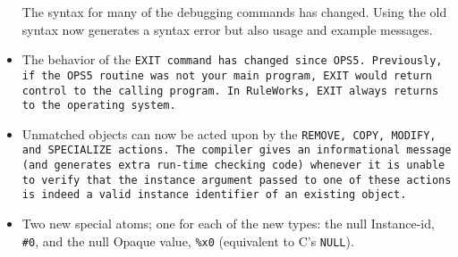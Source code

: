 \begin{itemize}
  The syntax for many of the debugging commands has changed. Using the
  old syntax now generates a syntax error but also usage and example
  messages.

\item The behavior of the \tt{EXIT} command has changed since
  OPS5. Previously, if the OPS5 routine was not your main program,
  \tt{EXIT} would return control to the calling program. In RuleWorks,
  \tt{EXIT} always returns to the operating system.

\item Unmatched objects can now be acted upon by the \tt{REMOVE},
  \tt{COPY}, \tt{MODIFY}, and \tt{SPECIALIZE} actions. The compiler
  gives an informational message (and generates extra run-time
  checking code) whenever it is unable to verify that the instance
  argument passed to one of these actions is indeed a valid instance
  identifier of an existing object.

\item Two new special atoms; one for each of the new types: the null
  Instance-id, \verb|#0|, and the null Opaque value, \verb|%x0|
  (equivalent to C's \verb|NULL|).
\end{itemize}
      
